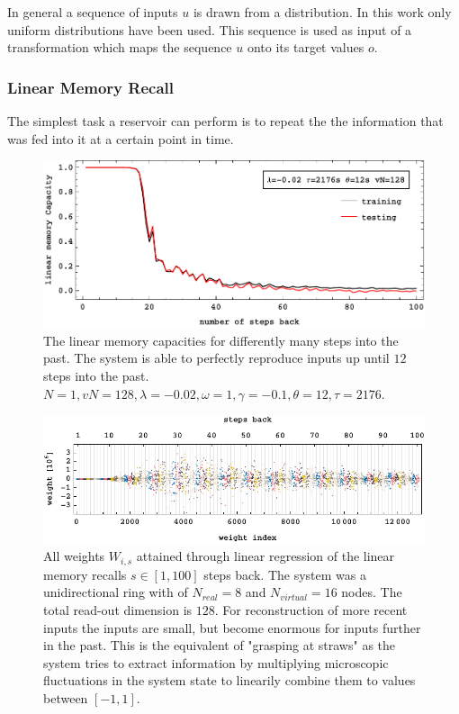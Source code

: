 	In general a sequence of inputs $u$ is drawn from a distribution. In this work only uniform distributions have been used. This sequence is used as input of a transformation which maps the sequence $u$ onto its target values $o$.

	
\subsubsection{Linear Memory Recall}
	The simplest task a reservoir can perform is to repeat the the information that was fed into it at a certain point in time.  

	\begin{figure}
	\centering
	\includegraphics[width=0.99\linewidth]{pics/linearMemoryCurveN1}
	\caption{The linear memory capacities for differently many steps into the past. The system is able to perfectly reproduce inputs up until $12$ steps into the past. $N=1, vN=128, \lambda=-0.02, \omega=1, \gamma=-0.1, \theta=12, \tau=2176$. }
	\label{fig:linearMemoryRecallCurveN1}
	\end{figure}

	\begin{figure}
	\centering
	\includegraphics[width=0.99\linewidth]{pics/weight_plot}
	\caption{All weights $W_{i,s}$ attained through linear regression of the linear memory recalls $s \in [1,100]$ steps back. The system was a unidirectional ring with of $N_{real}=8$ and $N_{virtual}=16$ nodes. The total read-out dimension is $128$. For reconstruction of more recent inputs the inputs are small, but become enormous for inputs further in the past. This is the equivalent of "grasping at straws" as the system tries to extract information by multiplying microscopic fluctuations in the system state to linearily combine them to values between $[-1,1]$.}
	\label{fig:linearMemoryRecallWeights}
	\end{figure}

